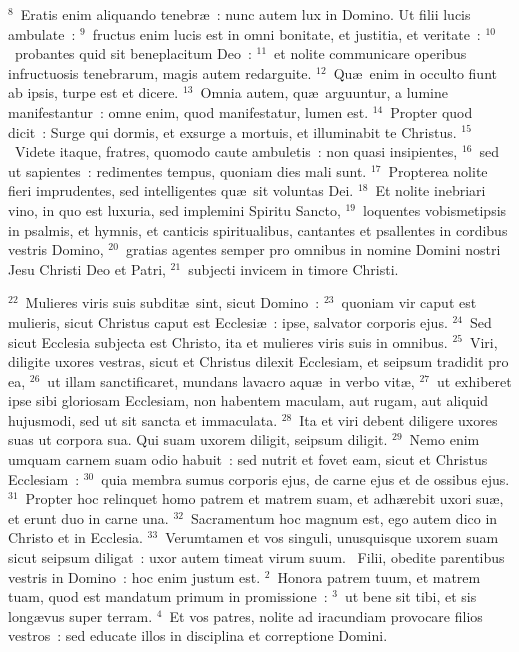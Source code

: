 ${}^{8}$~Eratis enim aliquando tenebr\ae~: nunc autem lux in Domino. Ut filii lucis ambulate~:
${}^{9}$~fructus enim lucis est in omni bonitate, et justitia, et veritate~:
${}^{10}$~probantes quid sit beneplacitum Deo~:
${}^{11}$~et nolite communicare operibus infructuosis tenebrarum, magis autem redarguite.
${}^{12}$~Qu\ae\ enim in occulto fiunt ab ipsis, turpe est et dicere.
${}^{13}$~Omnia autem, qu\ae\ arguuntur, a lumine manifestantur~: omne enim, quod manifestatur, lumen est.
${}^{14}$~Propter quod dicit~: Surge qui dormis, et exsurge a mortuis, et illuminabit te Christus.
${}^{15}$~Videte itaque, fratres, quomodo caute ambuletis~: non quasi insipientes,
${}^{16}$~sed ut sapientes~: redimentes tempus, quoniam dies mali sunt.
${}^{17}$~Propterea nolite fieri imprudentes, sed intelligentes qu\ae\ sit voluntas Dei.
${}^{18}$~Et nolite inebriari vino, in quo est luxuria, sed implemini Spiritu Sancto,
${}^{19}$~loquentes vobismetipsis in psalmis, et hymnis, et canticis spiritualibus, cantantes et psallentes in cordibus vestris Domino,
${}^{20}$~gratias agentes semper pro omnibus in nomine Domini nostri Jesu Christi Deo et Patri,
${}^{21}$~subjecti invicem in timore Christi.


${}^{22}$~Mulieres viris suis subdit\ae\ sint, sicut Domino~:
${}^{23}$~quoniam vir caput est mulieris, sicut Christus caput est Ecclesi\ae~: ipse, salvator corporis ejus.
${}^{24}$~Sed sicut Ecclesia subjecta est Christo, ita et mulieres viris suis in omnibus.
${}^{25}$~Viri, diligite uxores vestras, sicut et Christus dilexit Ecclesiam, et seipsum tradidit pro ea,
${}^{26}$~ut illam sanctificaret, mundans lavacro aqu\ae\ in verbo vit\ae ,
${}^{27}$~ut exhiberet ipse sibi gloriosam Ecclesiam, non habentem maculam, aut rugam, aut aliquid hujusmodi, sed ut sit sancta et immaculata.
${}^{28}$~Ita et viri debent diligere uxores suas ut corpora sua. Qui suam uxorem diligit, seipsum diligit.
${}^{29}$~Nemo enim umquam carnem suam odio habuit~: sed nutrit et fovet eam, sicut et Christus Ecclesiam~:
${}^{30}$~quia membra sumus corporis ejus, de carne ejus et de ossibus ejus.
${}^{31}$~Propter hoc relinquet homo patrem et matrem suam, et adh\ae rebit uxori su\ae , et erunt duo in carne una.
${}^{32}$~Sacramentum hoc magnum est, ego autem dico in Christo et in Ecclesia.
${}^{33}$~Verumtamen et vos singuli, unusquisque uxorem suam sicut seipsum diligat~: uxor autem timeat virum suum.
~\lettrine[lines=10,image=true,loversize=0.05,lraise=-0.03]{F}{}ilii, obedite parentibus vestris in Domino~: hoc enim justum est.
${}^{2}$~Honora patrem tuum, et matrem tuam, quod est mandatum primum in promissione~:
${}^{3}$~ut bene sit tibi, et sis long\ae vus super terram.
${}^{4}$~Et vos patres, nolite ad iracundiam provocare filios vestros~: sed educate illos in disciplina et correptione Domini.


